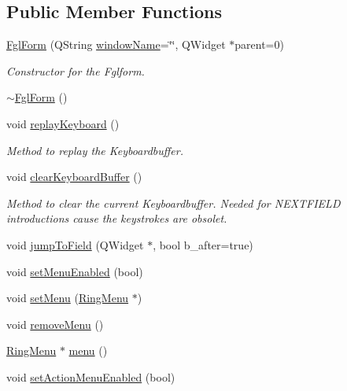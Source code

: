 \subsection*{Public Member Functions}
\begin{DoxyCompactItemize}
\item 
\hyperlink{classFglForm_a4a6d10fc6cce5a7984d59b80730cd7e1}{FglForm} (QString \hyperlink{classFglForm_a154084978ed81b8739db7197541881f5}{windowName}=\char`\"{}\char`\"{}, QWidget $\ast$parent=0)
\begin{DoxyCompactList}\small\item\em Constructor for the Fglform. \item\end{DoxyCompactList}\item 
\hyperlink{classFglForm_a14fc02c52beeeffefa92a4b3425da772}{$\sim$FglForm} ()
\item 
void \hyperlink{classFglForm_a304cb50242f0f546f3c750be160738e5}{replayKeyboard} ()
\begin{DoxyCompactList}\small\item\em Method to replay the Keyboardbuffer. \item\end{DoxyCompactList}\item 
void \hyperlink{classFglForm_a929ef0072e09235e5496c7f59c4be2e6}{clearKeyboardBuffer} ()
\begin{DoxyCompactList}\small\item\em Method to clear the current Keyboardbuffer. Needed for NEXTFIELD introductions cause the keystrokes are obsolet. \item\end{DoxyCompactList}\item 
void \hyperlink{classFglForm_a626014edfd45271d30f38d877601abd5}{jumpToField} (QWidget $\ast$, bool b\_\-after=true)
\item 
void \hyperlink{classFglForm_acfb920aa37d488d2877fe75441ac7f65}{setMenuEnabled} (bool)
\item 
void \hyperlink{classFglForm_a0060da33eb1943f1b762e8a164ede398}{setMenu} (\hyperlink{classRingMenu}{RingMenu} $\ast$)
\item 
void \hyperlink{classFglForm_a7b0af358781bf6b0f37d80e9383cf10e}{removeMenu} ()
\item 
\hyperlink{classRingMenu}{RingMenu} $\ast$ \hyperlink{classFglForm_acffbcaf62fc53ff47363cf13b2967242}{menu} ()
\item 
void \hyperlink{classFglForm_ab322288b13021e7b98a5cf87912d2f18}{setActionMenuEnabled} (bool)

\end{DoxyCompactItemize}
